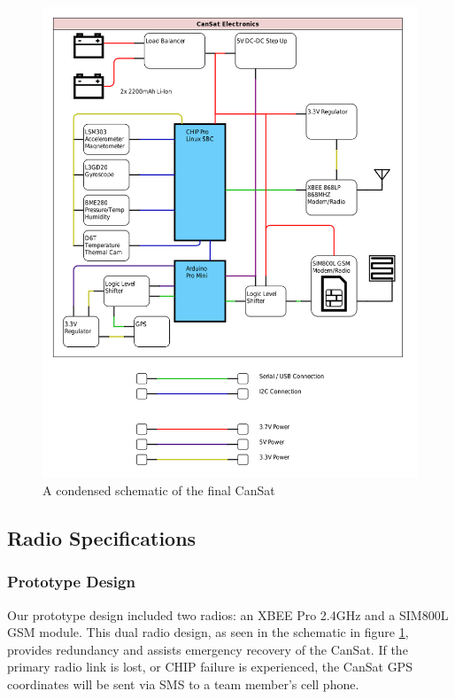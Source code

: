 \documentclass[]{report}
\begin{document}
\begin{figure}[h]
	\hfill\includegraphics[scale=0.7]{CanSat-detail.png}\hspace*{\fill}
	\caption{A condensed schematic of the final CanSat}
	\label{cschem}
\end{figure}

\subsection{Radio Specifications}
\subsubsection{Prototype Design}
Our prototype design included two radios: an XBEE Pro 2.4GHz and a SIM800L GSM module. This dual radio design, as seen in the schematic in figure \ref{cschem}, provides redundancy and assists emergency recovery of the CanSat. If the primary radio link is lost, or CHIP failure is experienced, the CanSat GPS coordinates will be sent via SMS to a team member's cell phone. 
\end{document}
